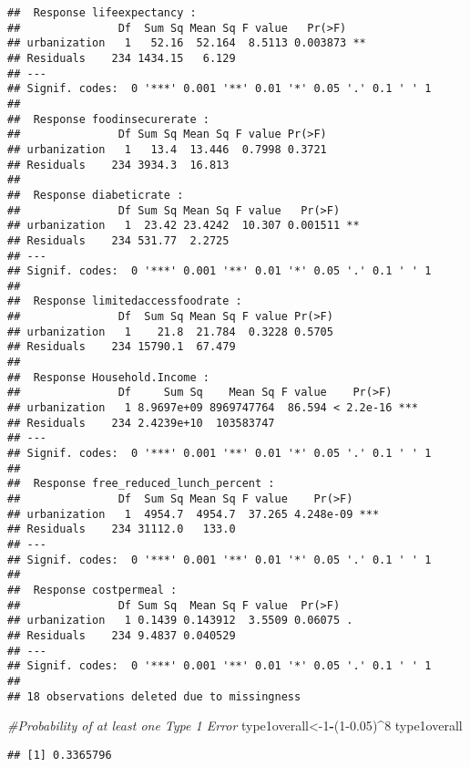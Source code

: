 \documentclass[]{article}
\newenvironment{Shaded}{\begin{snugshade}}{\end{snugshade}}
\newcommand{\CommentTok}[1]{\textcolor[rgb]{0.56,0.35,0.01}{\textit{#1}}}
\newcommand{\DecValTok}[1]{\textcolor[rgb]{0.00,0.00,0.81}{#1}}
\newcommand{\FloatTok}[1]{\textcolor[rgb]{0.00,0.00,0.81}{#1}}
\newcommand{\NormalTok}[1]{#1}
\newcommand{\OperatorTok}[1]{\textcolor[rgb]{0.81,0.36,0.00}{\textbf{#1}}}
\begin{document}
\begin{verbatim}
##  Response lifeexpectancy :
##               Df  Sum Sq Mean Sq F value   Pr(>F)   
## urbanization   1   52.16  52.164  8.5113 0.003873 **
## Residuals    234 1434.15   6.129                    
## ---
## Signif. codes:  0 '***' 0.001 '**' 0.01 '*' 0.05 '.' 0.1 ' ' 1
## 
##  Response foodinsecurerate :
##               Df Sum Sq Mean Sq F value Pr(>F)
## urbanization   1   13.4  13.446  0.7998 0.3721
## Residuals    234 3934.3  16.813               
## 
##  Response diabeticrate :
##               Df Sum Sq Mean Sq F value   Pr(>F)   
## urbanization   1  23.42 23.4242  10.307 0.001511 **
## Residuals    234 531.77  2.2725                    
## ---
## Signif. codes:  0 '***' 0.001 '**' 0.01 '*' 0.05 '.' 0.1 ' ' 1
## 
##  Response limitedaccessfoodrate :
##               Df  Sum Sq Mean Sq F value Pr(>F)
## urbanization   1    21.8  21.784  0.3228 0.5705
## Residuals    234 15790.1  67.479               
## 
##  Response Household.Income :
##               Df     Sum Sq    Mean Sq F value    Pr(>F)    
## urbanization   1 8.9697e+09 8969747764  86.594 < 2.2e-16 ***
## Residuals    234 2.4239e+10  103583747                      
## ---
## Signif. codes:  0 '***' 0.001 '**' 0.01 '*' 0.05 '.' 0.1 ' ' 1
## 
##  Response free_reduced_lunch_percent :
##               Df  Sum Sq Mean Sq F value    Pr(>F)    
## urbanization   1  4954.7  4954.7  37.265 4.248e-09 ***
## Residuals    234 31112.0   133.0                      
## ---
## Signif. codes:  0 '***' 0.001 '**' 0.01 '*' 0.05 '.' 0.1 ' ' 1
## 
##  Response costpermeal :
##               Df Sum Sq  Mean Sq F value  Pr(>F)  
## urbanization   1 0.1439 0.143912  3.5509 0.06075 .
## Residuals    234 9.4837 0.040529                  
## ---
## Signif. codes:  0 '***' 0.001 '**' 0.01 '*' 0.05 '.' 0.1 ' ' 1
## 
## 18 observations deleted due to missingness
\end{verbatim}

\begin{Shaded}
\begin{Highlighting}[]
\CommentTok{#Probability of at least one Type 1 Error}
\NormalTok{type1overall<-}\DecValTok{1}\OperatorTok{-}\NormalTok{(}\DecValTok{1}\FloatTok{-0.05}\NormalTok{)}\OperatorTok{^}\DecValTok{8}
\NormalTok{type1overall}
\end{Highlighting}
\end{Shaded}

\begin{verbatim}
## [1] 0.3365796
\end{verbatim}
\end{document}
